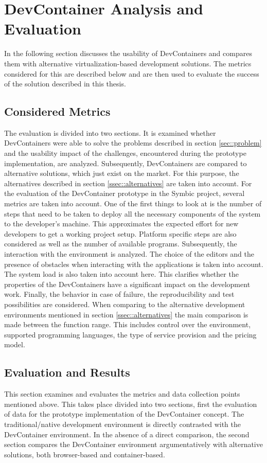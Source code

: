 
\section{DevContainer Analysis and Evaluation}\label{sec::eval}
In the following section discusses the usability of DevContainers and compares them with alternative virtualization-based development solutions. The metrics considered for this are described below and are then used to evaluate the success of the solution described in this thesis.

\subsection{Considered Metrics}
The evaluation is divided into two sections. It is examined whether DevContainers were able to solve the problems described in section \ref{sec::problem} and the usability impact of the challenges, encountered during the prototype implementation, are analyzed. Subsequently, DevContainers are compared to alternative solutions, which just exist on the market. For this purpose, the alternatives described in section \ref{ssec::alternatives} are taken into account.\newline
For the evaluation of the DevContainer prototype in the Symbic project, several metrics are taken into account. One of the first things to look at is the number of steps that need to be taken to deploy all the necessary components of the system to the developer's machine. This approximates the expected effort for new developers to get a working project setup. Platform specific steps are also considered as well as the number of available programs. Subsequently, the interaction with the environment is analyzed. The choice of the editors and the presence of obstacles when interacting with the applications is taken into account. The system load is also taken into account here. This clarifies whether the properties of the DevContainers have a significant impact on the development work. Finally, the behavior in case of failure, the reproducibility and test possibilities are considered. \newline
When comparing to the alternative development environments mentioned in section \ref{ssec::alternatives} the main comparison is made between the function range. This includes control over the environment, supported programming languages, the type of service provision and the pricing model.

\subsection{Evaluation and Results}\label{sses::eval_compare}
This section examines and evaluates the metrics and data collection points mentioned above. This takes place divided into two sections, first the evaluation of data for the prototype implementation of the DevContainer concept. The traditional/native development environment is directly contrasted with the DevContainer environment.
In the absence of a direct comparison, the second section compares the DevContainer environment argumentatively with alternative solutions, both browser-based and container-based.

